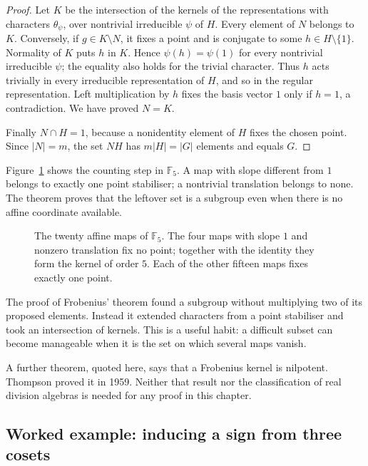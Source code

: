 \begin{proof}
Let $K$ be the intersection of the kernels of the representations with characters $\theta_\psi$, over nontrivial irreducible $\psi$ of $H$. Every element of $N$ belongs to $K$. Conversely, if $g\in K\setminus N$, it fixes a point and is conjugate to some $h\in H\setminus\{1\}$. Normality of $K$ puts $h$ in $K$. Hence $\psi(h)=\psi(1)$ for every nontrivial irreducible $\psi$; the equality also holds for the trivial character. Thus $h$ acts trivially in every irreducible representation of $H$, and so in the regular representation. Left multiplication by $h$ fixes the basis vector $1$ only if $h=1$, a contradiction. We have proved $N=K$.

Finally $N\cap H=1$, because a nonidentity element of $H$ fixes the chosen point. Since $|N|=m$, the set $NH$ has $m|H|=|G|$ elements and equals $G$.
\end{proof}

Figure~\ref{fig:v10new-ch09-affine} shows the counting step in $\mathbb F_5$. A map with slope different from $1$ belongs to exactly one point stabiliser; a nontrivial translation belongs to none. The theorem proves that the leftover set is a subgroup even when there is no affine coordinate available.

\begin{figure}[ht]
\centering
{}
\caption{The twenty affine maps of $\mathbb F_5$. The four maps with slope $1$ and nonzero translation fix no point; together with the identity they form the kernel of order $5$. Each of the other fifteen maps fixes exactly one point.}
\label{fig:v10new-ch09-affine}
\end{figure}

\begin{beauty}
The proof of Frobenius' theorem found a subgroup without multiplying two of its proposed elements. Instead it extended characters from a point stabiliser and took an intersection of kernels. This is a useful habit: a difficult subset can become manageable when it is the set on which several maps vanish.

A further theorem, quoted here, says that a Frobenius kernel is nilpotent. Thompson proved it in 1959. Neither that result nor the classification of real division algebras is needed for any proof in this chapter.
\end{beauty}

\subsection*{Worked example: inducing a sign from three cosets}

